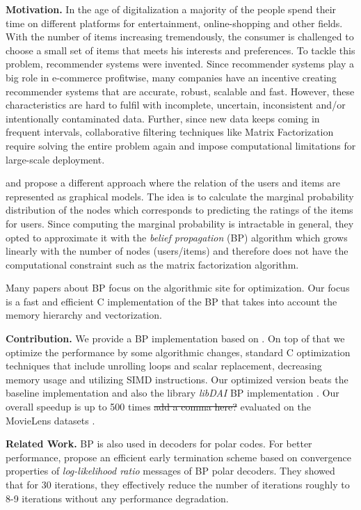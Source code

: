 \documentclass[letterpaper]{article}
\newcommand{\mypar}[1]{{\bf #1.}}
\begin{document}
\mypar{Motivation}
In the age of digitalization a majority of the people spend their time on different platforms for entertainment, online-shopping and other fields. With the number of items increasing tremendously, the consumer is challenged to choose a small set of items that meets his interests and preferences. To tackle this problem, recommender systems were invented. Since recommender systems play a big role in e-commerce profitwise, many companies have an incentive creating recommender systems that are accurate, robust, scalable and fast. However, these characteristics are hard to fulfil with incomplete, uncertain, inconsistent and/or intentionally contaminated data. Further, since new data keeps coming in frequent intervals, collaborative filtering techniques like Matrix Factorization require solving the entire problem again and impose computational limitations for large-scale deployment.

\citet{BPRS} and \citet{top-n-recommendation} propose a different approach where the relation of the users and items are represented as graphical models. The idea is to calculate the marginal probability distribution of the nodes which corresponds to predicting the ratings of the items for users. Since computing the marginal probability is intractable in general, they opted to approximate it with the \emph{belief propagation} (BP) algorithm which grows linearly with the number of nodes (users/items) and therefore does not have the computational constraint such as the matrix factorization algorithm.

Many papers about BP focus on the algorithmic site for optimization. Our focus is a fast and efficient C implementation of the BP that takes into account the memory hierarchy and vectorization.

\mypar{Contribution}
We provide a BP implementation based on \citet{top-n-recommendation}. On top of that we optimize the performance by some algorithmic changes, standard C optimization techniques that include unrolling loops and scalar replacement, decreasing memory usage and utilizing SIMD instructions. Our optimized version beats the baseline implementation and also the library \emph{libDAI} BP implementation \cite{libdai}. Our overall speedup is up to 500 times \st{add a comma here?} evaluated on the MovieLens datasets \cite{movieLens}.

\mypar{Related Work}
BP is also used in decoders for polar codes. For better performance, \citet{related1} propose an efficient early termination scheme based on convergence properties of \emph{log-likelihood ratio} messages of BP polar decoders. They showed that for 30 iterations, they effectively reduce the number of iterations roughly to 8-9 iterations without any performance degradation.
\end{document}
